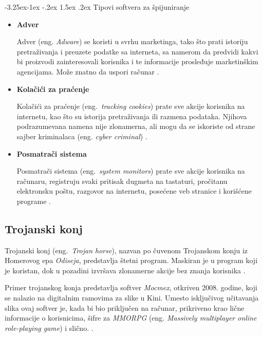 \documentclass[a4paper]{article}
\makeatletter
\renewcommand\paragraph{\@startsection{paragraph}{4}{\z@}%
   {-3.25ex\@plus -1ex \@minus -.2ex}%
   {1.5ex \@plus .2ex}%
   {\normalfont\normalsize\bfseries}}
\makeatother
\begin{document}
\paragraph{Tipovi softvera za špijuniranje}
\begin{itemize}
\item \textbf{Adver}

Adver (eng. \textit{Adware}) se koristi u svrhu marketinga, tako što prati istoriju pretraživanja i preuzete podatke sa interneta, sa namerom da predvidi kakvi bi proizvodi zainteresovali korisnika i te informacije prosleđuje marketinškim agencijama. Može znatno da uspori računar \cite{spyware}.

\item \textbf{Kolačići za praćenje}

Kolačići za praćenje (eng.~{\em tracking cookies}) prate sve akcije korisnika na internetu, kao što su istorija pretraživanja ili razmena podataka. Njihova podrazumevana namena nije zlonamerna, ali mogu da se iskoriste od strane sajber kriminalaca (eng. \textit{cyber criminal}) \cite{tracking_cookies}.

\item \textbf{Posmatrači sistema}

Posmatrači sistema (eng.~{\em system monitors}) prate sve akcije korisnika na računaru, registruju svaki pritisak dugmeta na tastaturi, pročitanu elektronsku poštu, razgovor na internetu, posećene veb stranice i korišćene programe \cite{spyware}.
    
\end{itemize}

\subsection{Trojanski konj}
\label{Odisej}

Trojanski konj (eng.~{\em Trojan horse}), nazvan po čuvenom Trojanskom konju iz Homerovog epa \textit{Odiseja}, predstavlja štetni program. Maskiran je u program koji je koristan, dok u pozadini izvršava zlonamerne akcije bez znanja korisnika \cite{trojanhorse}.

Primer trojanskog konja predstavlja softver \textit{Mocmex}, otkriven 2008. godine, koji se nalazio na digitalnim ramovima za slike u Kini. Umesto isključivog učitavanja slika ovaj softver je, kada bi bio priključen na računar, prikriveno krao lične informacije o korisnicima, šifre za \textit{MMORPG} (eng. \textit{Massively multiplayer online role-playing game}) i slično. \cite{ethics}. 
\end{document}
